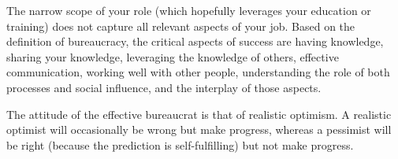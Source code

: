The narrow scope of your role (which hopefully leverages your education or training) does not capture all relevant aspects of your job. 
Based on the definition of \gls{bureaucracy}, the critical aspects of success are having knowledge, sharing your knowledge, leveraging the knowledge of others, effective communication, working well with other people, understanding the role of both processes and social influence, and the interplay of those aspects. 


The attitude of the effective bureaucrat  is that of realistic optimism. A realistic optimist will occasionally be wrong but make progress, whereas a pessimist will be right (because the prediction is self-fulfilling) but not make progress.
